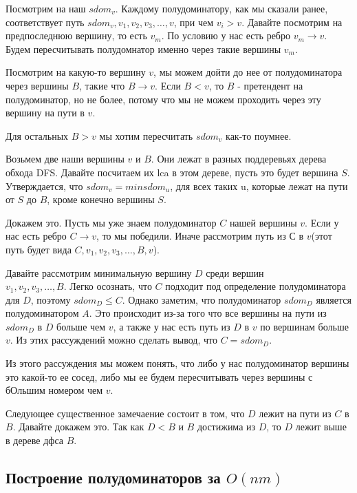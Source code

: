 \documentclass[a4paper, fontsize=12pt]{article}
\begin{document}
Посмотрим на наш $sdom_v$. Каждому полудоминатору, как мы сказали ранее, соответствует путь $sdom_v, v_1, v_2, v_3, \ldots, v$, при чем $v_i > v$. Давайте посмотрим на предпоследнюю вершину, то есть $v_m$. По условию у нас есть ребро $v_m \rightarrow v$. Будем пересчитывать полудомнатор именно через такие вершины $v_m$. 

Посмотрим на какую-то вершину $v$, мы можем дойти до нее от полудоминатора через вершины $B$, такие что $B \rightarrow v$. Если $B < v$, то $B$ - претендент на полудоминатор, но не более, потому что мы не можем проходить через эту вершину на пути в $v$.

Для остальных $B > v$ мы хотим пересчитать $sdom_v$ как-то поумнее. 

\begin{theorem} \label{t4}
Возьмем две наши вершины $v$ и $B$. Они лежат в разных поддеревьях дерева обхода DFS. Давайте посчитаем их lca в этом дереве, пусть это будет вершина $S$. Утверждается, что $sdom_v = min sdom_u$, для всех таких u, которые лежат на пути от $S$ до $B$, кроме конечно вершины $S$.

Докажем это. Пусть мы уже знаем полудоминатор $C$ нашей вершины $v$. Если у нас есть ребро $C \rightarrow v$, то мы победили. Иначе рассмотрим путь из $С$ в $v$(этот путь будет вида $C, v_1, v_2, v_3, \ldots, B, v$). 

Давайте рассмотрим минимальную вершину $D$ среди вершин \\ $v_1, v_2, v_3, \ldots, B$. Легко осознать, что $C$ подходит под определение полудоминатора для $D$, поэтому $sdom_D \leq C$. Однако заметим, что полудоминатор $sdom_D$ является полудоминатором $A$. Это происходит из-за того что все вершины на пути из $sdom_D$ в $D$ больше чем $v$, а также у нас есть путь из $D$ в $v$ по вершинам больше $v$. Из этих рассуждений можно сделать вывод, что $C = sdom_D$.

Из этого рассуждения мы можем понять, что либо у нас полудоминатор вершины это какой-то ее сосед, либо мы ее будем пересчитывать через вершины с бОльшим номером чем $v$.

Следующее существенное замечаение состоит в том, что $D$ лежит на пути из $C$ в $B$. Давайте докажем это. Так как $D < B$ и $B$ достижима из $D$, то $D$ лежит выше в дереве дфса $B$.
\end{theorem}


\subsection{Построение полудоминаторов за $O(nm)$} 
\end{document}
